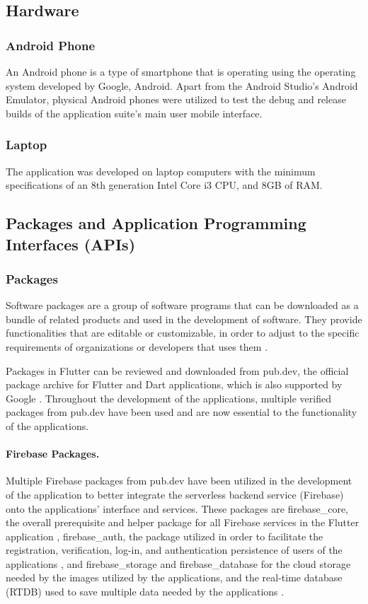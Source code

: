 \subsection{Hardware}
\subsubsection{Android Phone}
An Android phone is a type of smartphone that is operating using the operating system developed by Google, Android. Apart from the Android Studio's Android Emulator,  physical Android phones were utilized to test the debug and release builds of the application suite's main user mobile interface.

\subsubsection{Laptop}
The application was developed on laptop computers with the minimum specifications of an 8th generation Intel Core i3 CPU, and 8GB of RAM.

\subsection{Packages and Application Programming Interfaces (APIs)}

\subsubsection{Packages}
Software packages are a group of software programs that can be downloaded as a bundle of related products and used in the development of software.  They provide functionalities that are editable or customizable, in order to adjust to the specific requirements of organizations or developers that uses them \cite{jadhav2009evaluating}.

Packages in Flutter can be reviewed and downloaded from pub.dev, the official package archive for Flutter and Dart applications, which is also supported by Google \cite{pubdev}. Throughout the development of the applications, multiple verified packages from pub.dev have been used and are now essential to the functionality of the applications.

\paragraph{Firebase Packages.} Multiple Firebase packages from pub.dev have been utilized in the development of the application to better integrate the serverless backend service (Firebase) onto the applications' interface and services. These packages are firebase\_core, the overall prerequisite and helper package for all Firebase services in the Flutter application \cite{firebaseCore}, firebase\_auth, the package utilized in order to facilitate the registration, verification, log-in, and authentication persistence of users of the applications \cite{firebaseAuth}, and firebase\_storage and firebase\_database for the cloud storage needed by the images utilized by the applications, and the real-time database (RTDB) used to save multiple data needed by the applications \cite{firebaseAuth, firebaseStorage}.

